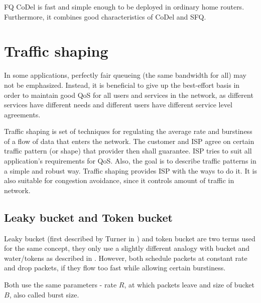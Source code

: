 FQ CoDel is fast and simple enough to be deployed in ordinary home routers. Furthermore, it combines good characteristics of CoDel and SFQ.

\section{Traffic shaping}

In some applications, perfectly fair queueing (the same bandwidth for all) may not be emphasized. Instead, it is beneficial\XX{,} to give up the best-effort basis in order to maintain good QoS for all users and services in the network, as different services have different needs and different users have different service level agreements. 

Traffic shaping is set of techniques for regulating the average rate and burstiness of a flow of data that enters the network. The customer and ISP agree on certain traffic pattern (or shape) that provider then shall guarantee. ISP tries to suit all application's requirements for QoS. Also, the goal is to describe traffic patterns in a simple and robust way. Traffic shaping provides ISP with the ways to do it. It is also suitable for congestion avoidance, since it controls amount of traffic in network.


\subsection{Leaky bucket and Token bucket}
\label{token_bucket}
Leaky bucket (first described by Turner in \cite{turner1986new}) and token bucket are two terms used for the same concept, they only use a slightly different analogy with bucket and water/tokens as described in \cite[Section 5.4.2]{Tanenbaum:2002:CN:572404}. However, both schedule packets at constant rate and drop packets, if they flow too fast while allowing certain burstiness.

Both use the same parameters - rate $R$, at which packets leave and size of bucket $B$, also called burst size.

